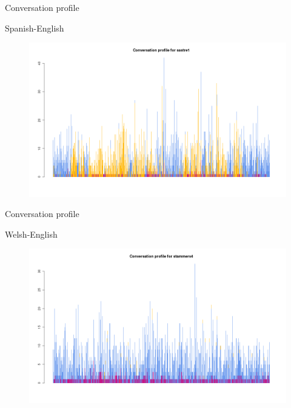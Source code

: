 \documentclass[hyperref={pdfpagelabels=false}, 14pt]{beamer}
\begin{document}
\begin{frame}{Conversation profile \\ \begin{normalsize}Spanish-English\end{normalsize}}
  \begin{figure}[h]
  \centering
  \includegraphics[scale=0.3]{images/allsastre1.png}
  \end{figure}
\end{frame}


\begin{frame}{Conversation profile \\ \begin{normalsize}Welsh-English\end{normalsize}}
  \begin{figure}[h]
  \centering
  \includegraphics[scale=0.3]{images/allstammers4.png}
  \end{figure}
\end{frame}
\end{document}
